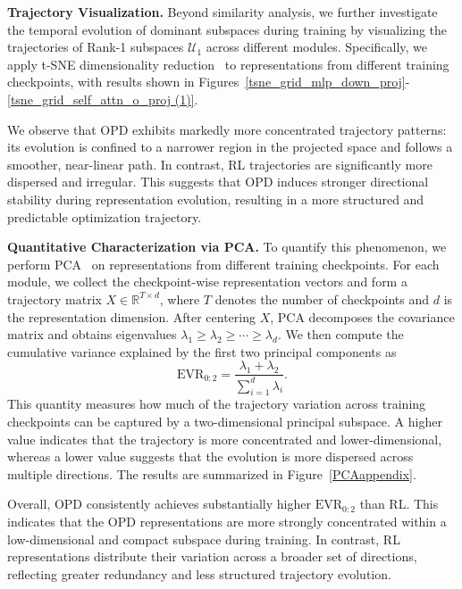\documentclass{llmxive}
\begin{document}
\textbf{Trajectory Visualization.}
Beyond similarity analysis, we further investigate the temporal evolution of dominant subspaces during training by visualizing the trajectories of Rank-1 subspaces \(\mathcal{U}_1\) across different modules. Specifically, we apply t-SNE dimensionality reduction~\citep{shi2021visualizingdatausinggtsne} to representations from different training checkpoints, with results shown in Figures~\ref{tsne_grid_mlp_down_proj}-\ref{tsne_grid_self_attn_o_proj (1)}.

We observe that OPD exhibits markedly more concentrated trajectory patterns: its evolution is confined to a narrower region in the projected space and follows a smoother, near-linear path. In contrast, RL trajectories are significantly more dispersed and irregular. This suggests that OPD induces stronger directional stability during representation evolution, resulting in a more structured and predictable optimization trajectory.

\textbf{Quantitative Characterization via PCA.}
To quantify this phenomenon, we perform PCA~\citep{Eckart1936TheAO} on representations from different training checkpoints. For each module, we collect the checkpoint-wise representation vectors and form a trajectory matrix \(X \in \mathbb{R}^{T \times d}\), where \(T\) denotes the number of checkpoints and \(d\) is the representation dimension. After centering \(X\), PCA decomposes the covariance matrix and obtains eigenvalues \(\lambda_1 \geq \lambda_2 \geq \cdots \geq \lambda_d\). We then compute the cumulative variance explained by the first two principal components as
\begin{equation}
\mathrm{EVR}_{0:2}
=
\frac{\lambda_1 + \lambda_2}{\sum_{i=1}^{d} \lambda_i}.
\end{equation}
This quantity measures how much of the trajectory variation across training checkpoints can be captured by a two-dimensional principal subspace. A higher value indicates that the trajectory is more concentrated and lower-dimensional, whereas a lower value suggests that the evolution is more dispersed across multiple directions. The results are summarized in Figure~\ref{PCAappendix}.

Overall, OPD consistently achieves substantially higher \(\mathrm{EVR}_{0:2}\) than RL. This indicates that the OPD representations are more strongly concentrated within a low-dimensional and compact subspace during training. In contrast, RL representations distribute their variation across a broader set of directions, reflecting greater redundancy and less structured trajectory evolution.
\end{document}
